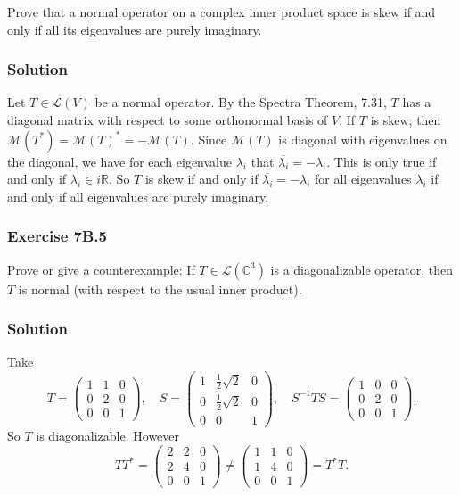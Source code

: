 Prove that a normal operator on a complex inner product space is skew if and only if all its eigenvalues are purely imaginary.

\subsubsection*{Solution}

Let $T \in \mathcal{L}(V)$ be a normal operator.
By the Spectra Theorem, 7.31, $T$ has a diagonal matrix with respect to some orthonormal basis of $V$.
If $T$ is skew, then $\mathcal{M}(T^*) = \mathcal{M}(T)^* = -\mathcal{M}(T)$.
Since $\mathcal{M}(T)$ is diagonal with eigenvalues on the diagonal, we have for each eigenvalue $\lambda_i$ that $\overline{\lambda_i} = -\lambda_i$.
This is only true if and only if $\lambda_i \in i\mathbb{R}$.
So $T$ is skew if and only if $\overline{\lambda_i} = -\lambda_i$ for all eigenvalues $\lambda_i$ if and only if all eigenvalues are purely imaginary.


\subsubsection*{Exercise 7B.5}

Prove or give a counterexample: If $T \in \mathcal{L}(\mathbb{C}^3)$ is a diagonalizable operator, then $T$ is normal (with respect to the usual inner product).

\subsubsection*{Solution}

Take
\begin{equation*}
T = \begin{pmatrix}
    1 & 1 & 0 \\
    0 & 2 & 0 \\
    0 & 0 & 1
\end{pmatrix}, \quad
S = \begin{pmatrix}
    1 & \frac{1}{2}\sqrt{2} & 0 \\
    0 & \frac{1}{2}\sqrt{2} & 0 \\
    0 & 0 & 1
\end{pmatrix}, \quad
S^{-1}TS = \begin{pmatrix}
    1 & 0 & 0 \\
    0 & 2 & 0 \\
    0 & 0 & 1
\end{pmatrix}.
\end{equation*}
So $T$ is diagonalizable.
However
\begin{equation*}
    TT^* = \begin{pmatrix}
        2 & 2 & 0 \\
        2 & 4 & 0 \\
        0 & 0 & 1
    \end{pmatrix}
    \neq
    \begin{pmatrix}
        1 & 1 & 0 \\
        1 & 4 & 0 \\
        0 & 0 & 1
    \end{pmatrix}
    = T^*T.
\end{equation*}



